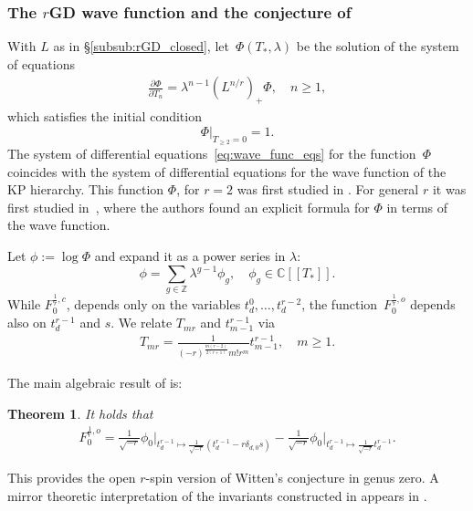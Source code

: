 \documentclass[11pt]{amsart}
\newtheorem{thm}[dummy]{Theorem}
\theoremstyle{definition}
\theoremstyle{remark}
\newcommand{\<}{\left<}
\renewcommand{\>}{\right>}
\numberwithin{equation}{section}
\def\C{{\mathbb C}}
\begin{document}
\subsubsection{The $r$GD wave function and the conjecture of \cite{BCT3}}
With $L$ as in \S \ref{subsub:rGD_closed}, let~$\Phi(T_*,\lambda)$ be the solution of the system of %
equations
\begin{gather}\label{eq:wave_func_eqs}
\frac{\partial\Phi}{\partial T_n}=\lambda^{n-1}(L^{n/r})_+\Phi,\quad n\geq 1,
\end{gather}
which %
satisfies the initial condition
$$
\left.\Phi\right|_{T_{\geq 2}=0}=1.
$$
The system of differential equations~\eqref{eq:wave_func_eqs} for the function~$\Phi$ coincides with the system of differential equations for the wave function of the KP hierarchy.
This function $\Phi$, for $r=2$ was first studied in \cite{Bur16}. For general $r$ it was first studied in~\cite{BY15}, where the authors found an explicit formula for $\Phi$ in terms of the wave function.



Let $\phi:=\log\Phi$ and expand it as a power %
series in $\lambda:$
$$
\phi=\sum_{g\in\mathbb{Z}}\lambda^{g-1}\phi_g,\quad \phi_g\in\C[[T_*]].
$$
While $F^{\frac{1}{r},c}_0$, depends %
only on the variables $t^0_d,\ldots,t^{r-2}_d$, the function~$F^{\frac{1}{r},o}_0$ depends also on $t^{r-1}_d$ and $s$. We relate $T_{mr}$ and $t^{r-1}_{m-1}$ via
\begin{gather}\label{eq:r-1_coord_change}
T_{mr}=\frac{1}{(-r)^{\frac{m(r-2)}{2(r+1)}}m!r^m}t^{r-1}_{m-1},\quad m\ge 1.
\end{gather}

The main algebraic result of \cite{BCT2} is:

\begin{thm}\label{thm:main_BCT2}
It holds that
\begin{gather}\label{eq:main_res_BCT}
F^{\frac{1}{r},o}_0=\frac{1}{\sqrt{-r}}\phi_0\big|_{t^{r-1}_d\mapsto \frac{1}{\sqrt{-r}}(t^{r-1}_d-r\delta_{d,0}s)}-\frac{1}{\sqrt{-r}}\phi_0\big|_{t^{r-1}_d\mapsto\frac{1}{\sqrt{-r}}t^{r-1}_d}.
\end{gather}
\end{thm}
\noindent This provides the open $r$-spin version of Witten's conjecture in genus zero. A mirror theoretic interpretation of the invariants constructed in \cite{BCT2} appears in \cite{GKT}.
\end{document}

